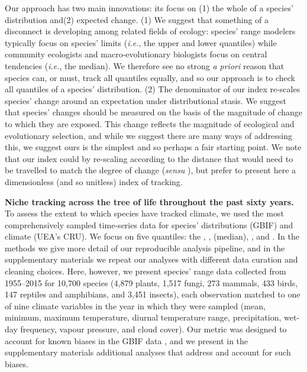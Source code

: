 \documentclass[12pt]{report}
\begin{document}
Our approach has two main innovations: its focus on (1) the whole of a
species' distribution and(2) expected change. (1) We suggest that
something of a disconnect is developing among related fields of
ecology: species' range modelers typically focus on species'
limits\supercite{Sexton2009} (\emph{i.e.}, the upper and lower
quantiles) while community ecologists \supercite{Tilman2004} and
macro-evolutionary \supercite{Zanne2018} biologists focus on central
tendencies (\emph{i.e.}, the median). We therefore see no strong
\emph{a priori} reason that species can, or must, track all quantiles
equally, and so our approach is to check all quantiles of a species'
distribution. (2) The denominator of our index re-scales species'
change around an expectation under distributional stasis. We suggest
that species' changes should be measured on the basis of the magnitude
of change to which they are exposed. This change reflects the
magnitude of ecological and evolutionary selection, and while we
suggest there are many ways of addressing this, we suggest ours is the
simplest and so perhaps a fair starting point. We note that our index
could by re-scaling according to the distance that would need to be
travelled to match the degree of change (\emph{sensu}
\citeauthor{Loarie2009}\supercite{Loarie2009}), but prefer to present
here a dimensionless (and so unitless) index of tracking.

\textbf{Niche tracking across the tree of life throughout the past
  sixty years.} To assess the extent to which species have tracked
climate, we used the most comprehensively sampled time-series data for
species' distributions (GBIF\supercite{url_gbif}) and climate (UEA's
CRU\supercite{Harris2014}). We focus on five quantiles: the ,
,  (median), , and . In the methods we
give more detail of our reproducible analysis pipeline, and in the
supplementary materials we repeat our analyses with different data
curation and cleaning choices. Here, however, we present species'
range data collected from 1955--2015 for 10,700 species (4,879 plants,
1,517 fungi, 273 mammals, 433 birds, 147 reptiles and amphibians, and
3,451 insects), each observation matched to one of nine climate
variables in the year in which they were sampled (mean, minimum,
maximum temperature, diurnal temperature range, precipitation, wet-day
frequency, vapour pressure, and cloud cover). Our metric was designed
to account for known biases in the GBIF data \supercite{Beck2014}, and
we present in the supplementary materials additional analyses that
address and account for such biases.
\end{document}
